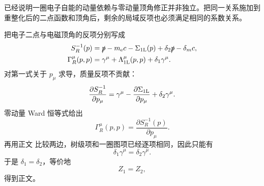 \begin{derivation}

 已经说明一圈电子自能的动量依赖与零动量顶角修正并非独立。把同一关系施加到重整化后的二点函数和顶角后，剩余的局域反项也必须满足相同的系数关系。

把电子二点与电磁顶角的反项分别写成
\begin{align*}
S_R^{-1}(p)
&=\slashed p-m_{\mathrm e} c-\Sigma_{\rm 1L}(p)
+\delta_2\slashed p-\delta_m c,\\
\Gamma_R^\mu(p,p)
&=\gamma^\mu+\Lambda_{\rm 1L}^\mu(p,p)
+\delta_1\gamma^\mu.
\end{align*}
对第一式关于 \(p_\mu\) 求导，质量反项不贡献：
\begin{equation*}
\frac{\partial S_R^{-1}}{\partial p_\mu}
=\gamma^\mu
-\frac{\partial\Sigma_{\rm 1L}}{\partial p_\mu}
+\delta_2\gamma^\mu.
\end{equation*}
零动量 Ward 恒等式给出
\begin{equation*}
\Gamma_R^\mu(p,p)
=\frac{\partial S_R^{-1}(p)}{\partial p_\mu}.
\end{equation*}
再用正文 比较两边，树级项和一圈图项已经逐项相同，因此只能有
\begin{equation*}
\delta_1\gamma^\mu=\delta_2\gamma^\mu.
\end{equation*}
于是 \(\delta_1=\delta_2\)，等价地
\begin{equation*}
Z_1=Z_2,
\end{equation*}
得到正文。
\end{derivation}

